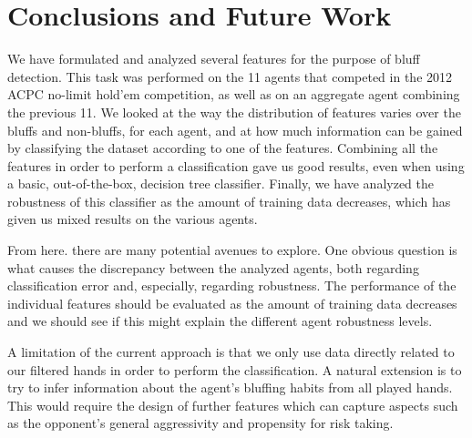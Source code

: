 \documentclass[letterpaper]{article}
\begin{document}
\section{
\fontsize{12pt}{15pt} 
\selectfont
Conclusions and Future Work}
\fontsize{10pt}{12pt} 
\selectfont
We have formulated and analyzed several features for the purpose of bluff detection. This task was performed on the 11 agents that competed in the 2012 ACPC no-limit hold'em competition, as well as on an aggregate agent combining the previous 11. We looked at the way the distribution of features varies over the bluffs and non-bluffs, for each agent, and at how much information can be gained by classifying the dataset according to one of the features. Combining all the features in order to perform a classification gave us good results, even when using a basic, out-of-the-box, decision tree classifier. Finally, we have analyzed the robustness of this classifier as the amount of training data decreases, which has given us mixed results on the various agents.

From here. there are many potential avenues to explore. One obvious question is what causes the discrepancy between the analyzed agents, both regarding classification error and, especially, regarding robustness. The performance of the individual features should be evaluated as the amount of training data decreases and we should see if this might explain the different agent robustness levels. 

A limitation of the current approach is that we only use data directly related to our filtered hands in order to perform the classification. A natural extension is to try to infer information about the agent's bluffing habits from all played hands. This would require the design of further features which can capture aspects such as the opponent's general aggressivity and propensity for risk taking.
\end{document}
